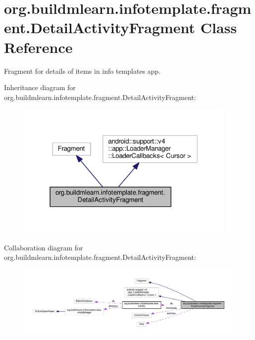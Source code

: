 \hypertarget{classorg_1_1buildmlearn_1_1infotemplate_1_1fragment_1_1DetailActivityFragment}{}\section{org.\+buildmlearn.\+infotemplate.\+fragment.\+Detail\+Activity\+Fragment Class Reference}
\label{classorg_1_1buildmlearn_1_1infotemplate_1_1fragment_1_1DetailActivityFragment}


Fragment for details of items in info template\textquotesingle{}s app.  




Inheritance diagram for org.\+buildmlearn.\+infotemplate.\+fragment.\+Detail\+Activity\+Fragment\+:
\nopagebreak
\begin{figure}[H]
\begin{center}
\leavevmode
\includegraphics[width=303pt]{classorg_1_1buildmlearn_1_1infotemplate_1_1fragment_1_1DetailActivityFragment__inherit__graph}
\end{center}
\end{figure}


Collaboration diagram for org.\+buildmlearn.\+infotemplate.\+fragment.\+Detail\+Activity\+Fragment\+:
\nopagebreak
\begin{figure}[H]
\begin{center}
\leavevmode
\includegraphics[width=350pt]{classorg_1_1buildmlearn_1_1infotemplate_1_1fragment_1_1DetailActivityFragment__coll__graph}
\end{center}
\end{figure}

